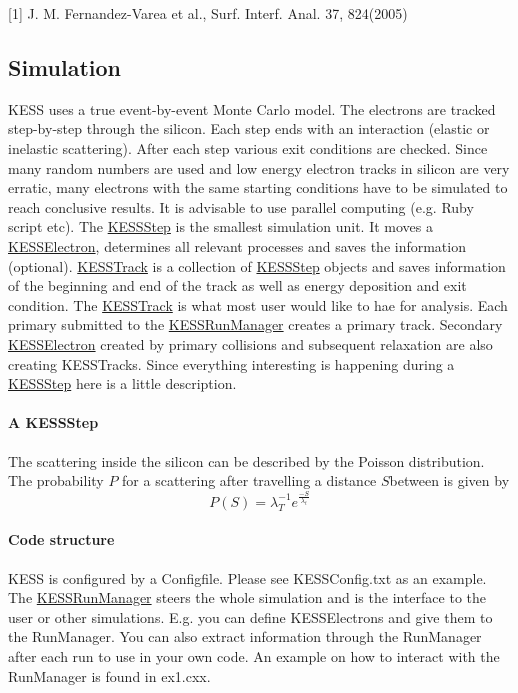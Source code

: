 \mbox{[}1\mbox{]} J. M. Fernandez-\/Varea et al., Surf. Interf. Anal. 37, 824(2005) \hypertarget{KESSSimulation}{}\subsection{Simulation}\label{KESSSimulation}
KESS uses a true event-\/by-\/event Monte Carlo model. The electrons are tracked step-\/by-\/step through the silicon. Each step ends with an interaction (elastic or inelastic scattering). After each step various exit conditions are checked. Since many random numbers are used and low energy electron tracks in silicon are very erratic, many electrons with the same starting conditions have to be simulated to reach conclusive results. It is advisable to use parallel computing (e.g. Ruby script etc). The \hyperlink{class_kassiopeia_1_1_k_e_s_s_step}{KESSStep} is the smallest simulation unit. It moves a \hyperlink{class_kassiopeia_1_1_k_e_s_s_electron}{KESSElectron}, determines all relevant processes and saves the information (optional). \hyperlink{class_kassiopeia_1_1_k_e_s_s_track}{KESSTrack} is a collection of \hyperlink{class_kassiopeia_1_1_k_e_s_s_step}{KESSStep} objects and saves information of the beginning and end of the track as well as energy deposition and exit condition. The \hyperlink{class_kassiopeia_1_1_k_e_s_s_track}{KESSTrack} is what most user would like to hae for analysis. Each primary submitted to the \hyperlink{class_kassiopeia_1_1_k_e_s_s_run_manager}{KESSRunManager} creates a primary track. Secondary \hyperlink{class_kassiopeia_1_1_k_e_s_s_electron}{KESSElectron} created by primary collisions and subsequent relaxation are also creating KESSTracks. Since everything interesting is happening during a \hyperlink{class_kassiopeia_1_1_k_e_s_s_step}{KESSStep} here is a little description.\hypertarget{_k_e_s_s_simulation_KESSStep}{}\paragraph{A KESSStep}\label{_k_e_s_s_simulation_KESSStep}
The scattering inside the silicon can be described by the Poisson distribution. The probability $ P $ for a scattering after travelling a distance $ S $between is given by \[ P(S) = \lambda_T^{-1}e^{\frac{-S}{\lambda_t}}\]\hypertarget{_k_e_s_s_simulation_structure}{}\paragraph{Code structure}\label{_k_e_s_s_simulation_structure}
KESS is configured by a Configfile. Please see KESSConfig.txt as an example. The \hyperlink{class_kassiopeia_1_1_k_e_s_s_run_manager}{KESSRunManager} steers the whole simulation and is the interface to the user or other simulations. E.g. you can define KESSElectrons and give them to the RunManager. You can also extract information through the RunManager after each run to use in your own code. An example on how to interact with the RunManager is found in ex1.cxx.

